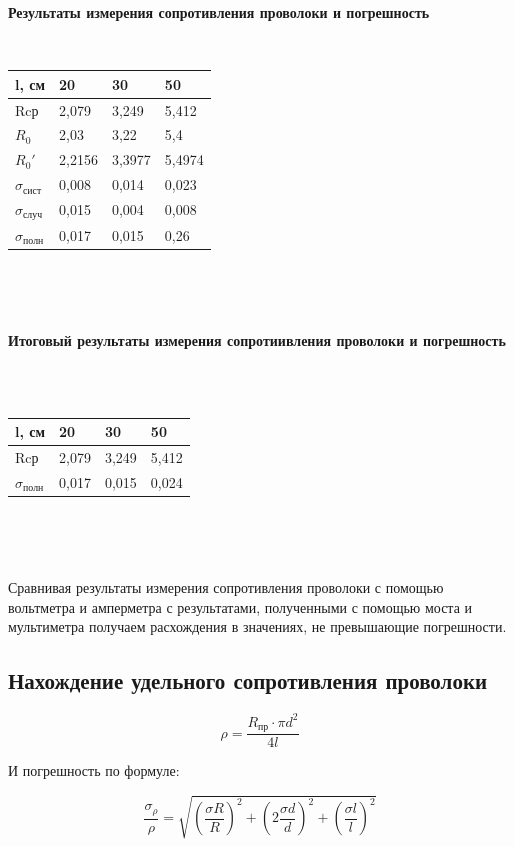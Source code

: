 \documentclass[a4paper,12pt]{article} %
\begin{document}
\textbf{Результаты измерения сопротивления проволоки и погрешность}
\

\

    \begin{tabular}{|l|l|l|l|}
    \hline
    l, см      & 20     & 30     & 50     \\ \hline
    Rcр        & 2,079  & 3,249  & 5,412  \\
    $R_0$       & 2,03   & 3,22   & 5,4    \\
    $R_0'$      & 2,2156 & 3,3977 & 5,4974 \\ \hline
    $\sigma_{сист}$ & 0,008  & 0,014  & 0,023  \\
    $\sigma_{случ}$ & 0,015  & 0,004  & 0,008  \\
    $\sigma_{полн}$ & 0,017  & 0,015  & 0,26   \\ \hline
    \end{tabular}
\

\

\textbf{Итоговый результаты измерения сопротиивления проволоки и погрешность}
\

\

    \begin{tabular}{|l|l|l|l|}
    \hline
    l, см       & 20    & 30    & 50    \\ \hline
    Rcр         & 2,079 & 3,249 & 5,412 \\ \hline
    $\sigma_{полн}$ & 0,017 & 0,015 & 0,024 \\ \hline
    \end{tabular}

\

\

Сравнивая результаты измерения сопротивления проволоки с помощью вольтметра и амперметра с результатами, полученными с помощью моста и мультиметра получаем расхождения в значениях, не превышающие погрешности.

\subsection{Нахождение удельного сопротивления проволоки}

\[ \rho = \frac{R_{пр}\cdot \pi d^2}{4l}\]

И погрешность по формуле:

\[\frac{\sigma_{\rho}}{\rho}=\sqrt{(\frac{\sigma R}{R})^2+(2\frac{\sigma d}{d})^2+(\frac{\sigma l}{l})^2}\]

\

\
\end{document}
